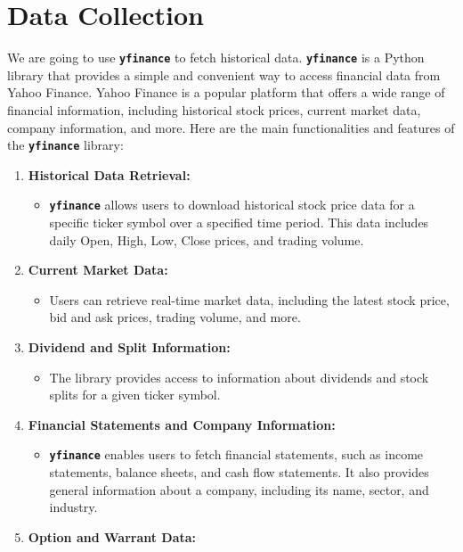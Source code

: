 \documentclass[
  letterpaper,
  DIV=11,
  numbers=noendperiod]{scrreprt}
\providecommand{\tightlist}{%
  \setlength{\itemsep}{0pt}\setlength{\parskip}{0pt}}\usepackage{longtable,booktabs,array}
\begin{document}
\section{Data Collection}\label{data-collection-1}

We are going to use \textbf{\texttt{yfinance}} to fetch historical data.
\textbf{\texttt{yfinance}} is a Python library that provides a simple
and convenient way to access financial data from Yahoo Finance. Yahoo
Finance is a popular platform that offers a wide range of financial
information, including historical stock prices, current market data,
company information, and more. Here are the main functionalities and
features of the \textbf{\texttt{yfinance}} library:

\begin{enumerate}
\def\labelenumi{\arabic{enumi}.}
\item
  \textbf{Historical Data Retrieval:}

  \begin{itemize}
  \tightlist
  \item
    \textbf{\texttt{yfinance}} allows users to download historical stock
    price data for a specific ticker symbol over a specified time
    period. This data includes daily Open, High, Low, Close prices, and
    trading volume.
  \end{itemize}
\item
  \textbf{Current Market Data:}

  \begin{itemize}
  \tightlist
  \item
    Users can retrieve real-time market data, including the latest stock
    price, bid and ask prices, trading volume, and more.
  \end{itemize}
\item
  \textbf{Dividend and Split Information:}

  \begin{itemize}
  \tightlist
  \item
    The library provides access to information about dividends and stock
    splits for a given ticker symbol.
  \end{itemize}
\item
  \textbf{Financial Statements and Company Information:}

  \begin{itemize}
  \tightlist
  \item
    \textbf{\texttt{yfinance}} enables users to fetch financial
    statements, such as income statements, balance sheets, and cash flow
    statements. It also provides general information about a company,
    including its name, sector, and industry.
  \end{itemize}
\item
  \textbf{Option and Warrant Data:}


\end{enumerate}
\end{document}
